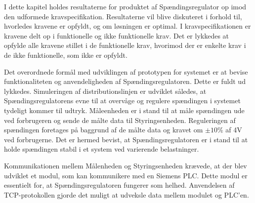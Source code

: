 
I dette kapitel holdes resultaterne for produktet af Spændingsregulator op imod den udformede kravspecifikation. Resultaterne vil blive diskuteret i forhold til, hvorledes kravene er opfyldt, og om løsningen er optimal. I kravspecifikationen er kravene delt op i funktionelle og ikke funktionelle krav. Det er lykkedes at opfylde alle kravene stillet i de funktionelle krav, hvorimod der er enkelte krav i de ikke funktionelle, som ikke er opfyldt. 

Det overordnede formål med udviklingen af prototypen for systemet er at bevise funktionaliteten og anvendeligheden af Spændingsregulatoren. Dette er fuldt ud lykkedes. Simuleringen af distributionslinjen er udviklet således, at Spændingsregulatorens evne til at overvåge og regulere spændingen i systemet tydeligt kommer til udtryk. Måleenheden er i stand til at måle spændingen ude ved forbrugeren og sende de målte data til Styringsenheden. Reguleringen af spændingen foretages på baggrund af de målte data og kravet om $\pm10\%$ af 4V ved forbrugerne. Det er hermed bevist, at Spændingsregulatoren er i stand til at holde spændingen stabil i et system ved varierende belastninger. 

Kommunikationen mellem Målenheden og Styringsenheden krævede, at der blev udviklet et modul, som kan kommunikere med en Siemens PLC. Dette modul er essentielt for, at Spændingsregulatoren fungerer som helhed. Anvendelsen af TCP-protokollen gjorde det muligt at udveksle data mellem modulet og PLC'en. 


